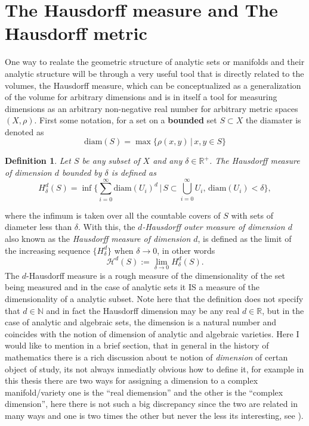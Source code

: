 \documentclass[12pt,twoside,a4paper]{report}
\newtheorem{definition}{Definition}[section]
\newcommand{\nat}{\ensuremath{ \mathbb N }}
\newcommand{\re}{\ensuremath{\mathbb R }}
\begin{document}
\section{The Hausdorff measure and The Hausdorff metric}
\noindent One way to realate the geometric structure of analytic sets or manifolds and their analytic structure will be through a very useful tool that is directly related to the volumes, the Hausdorff measure, which can be conceptualized as a generalization of the volume for arbitrary dimensions and is in itself a tool for measuring dimensions as an arbitrary non-negative real number for arbitrary metric spaces $(X,\rho)$. First some notation, for a set on a \textbf{bounded} set $S\subset X$ the diamater is denoted as
\[
\textrm{diam}(S)=\max\{\rho(x,y)\,|\,x,y\in S\}
\]
\begin{definition}
Let $S$ be any subset of $X$ and any $\delta\in\re^{+}$. The Hausdorff measure of dimension $d$ bounded by $\delta$ is defined as
\[
H_{\delta}^{d}(S)=\inf\Big\{\sum_{i=0}^{\infty}\textrm{diam}(U_i)^{d}\,|\,S\subset\bigcup_{i=0}^{\infty}U_i,\,\textrm{diam}(U_i)<\delta\Big\},
\]
\end{definition}
\noindent where the infimum is taken over all the countable covers of $S$ with sets of diameter less than $\delta$. With this, the \emph{$d$-Hausdorff outer measure of dimension $d$} also known as the \emph{Hausdorff measure of dimension $d$}, is defined as the limit of the increasing sequence $\{H_{\delta}^d\}$ when $\delta\rightarrow 0$, in other words
\[
\mathcal{H}^d(S):=\lim_{\delta\rightarrow 0}H_{\delta}^d(S).
\]
The $d$-Hausdorff measure is a rough measure of the dimensionality of the set being measured and in the case of analytic sets it IS a measure of the dimensionality of a analytic subset. Note here that the definition does not specify that $d\in\nat$ and in fact the Hausdorff dimension may be any real $d\in\re$, but in the case of analytic and algebraic sets, the dimension is a natural number and coincides with the notion of dimension of analytic and algebraic varieties. Here I would like to mention in a brief section, that in general in the history of mathematics there is a rich discussion about te notion of \emph{dimension} of certan object of study, its not always inmediatly obvious how to define it, for example in this thesis there are two ways for assigning a dimension to a complex manifold/variety one is the ``real diemension'' and the other is the ``complex dimension'', here there is not such a big discrepancy since the two are related in many ways and one is two times the other but never the less its interesting, see \cite{YURI-MANIM:ON-THE-NOTION-OF-DIMENSION..}).
\end{document}
